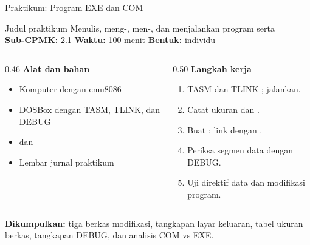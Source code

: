 \documentclass[aspectratio=169,11pt]{beamer}
\begin{document}
\begin{frame}{Praktikum: Program EXE dan COM}
\begin{block}{Judul praktikum}
\small Menulis, meng-, men-, dan menjalankan
program  serta \\[0.15em]
\textbf{Sub-CPMK:} 2.1 \quad\textbullet\quad
\textbf{Waktu:} 100 menit \quad\textbullet\quad
\textbf{Bentuk:} individu
\end{block}

\vspace{0.2em}
\begin{columns}[t]
\begin{column}{0.46\textwidth}
{\color{obeBlue}\bfseries Alat dan bahan}
\begin{itemize}\footnotesize
    \item Komputer dengan emu8086
    \item DOSBox dengan TASM, TLINK, dan DEBUG
    \item {} dan 
    \item Lembar jurnal praktikum
\end{itemize}
\end{column}
\begin{column}{0.50\textwidth}
{\color{obeBlue}\bfseries Langkah kerja}
\begin{enumerate}\footnotesize
    \item TASM dan TLINK ; jalankan.
    \item Catat ukuran  dan .
    \item Buat ; link dengan .
    \item Periksa segmen data dengan DEBUG.
    \item Uji direktif data dan modifikasi program.
\end{enumerate}
\end{column}
\end{columns}

\vspace{0.2em}
{\footnotesize\textbf{Dikumpulkan:} tiga berkas 
modifikasi, tangkapan layar keluaran, tabel ukuran berkas,
tangkapan DEBUG, dan analisis COM vs EXE.\par}
\end{frame}
\end{document}
